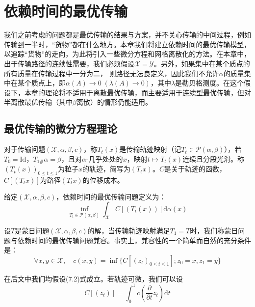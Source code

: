 \documentclass[cn,10pt,math=newtx,citestyle=gb7714-2015,bibstyle=gb7714-2015]{elegantbook}
\begin{document}
\chapter{依赖时间的最优传输}

我们之前考虑的问题都是最优传输的结果与方案，并不关心传输的中间过程，例如传输到一半时，“货物”都在什么地方。本章我们将建立依赖时间的最优传输模型，以追踪“货物”的走向，为此将引入一些微分方程和网格离散化的方法。在本章中，出于传输路径的连续性需要，我们必须假设$\mathcal{X}=\mathcal{Y}$。另外，如果集中在某个质点的所有质量在传输过程中一分为二，
则路径无法良定义，因此我们不允许$\alpha$的质量集中在某个质点上，即$\alpha(A)\to 0\;(\lambda(A)\to 0)$，其中$\lambda$是勒贝格测度。在这个假设下，本章的理论将不适用于离散最优传输，而主要适用于连续型最优传输，但对半离散最优传输（其中$\beta$离散）的情形仍能适用。

\section{最优传输的微分方程理论}

\begin{definition}[轨迹与位移成本]
    对于传输问题$(\mathcal{X}, \alpha,\beta,c)$，称$T_t(x)$是传输轨迹映射（记$T_t\in \mathcal{P}(\alpha,\beta)$），若$T_0=\text{Id}$，$T_{1\#}\alpha=\beta$，且对$\alpha$-几乎处处的$x$，映射$t\mapsto T_t(x)$连续且分段光滑。称$(T_t(x))_{0\leq t\leq 1}$为粒子$x$的轨迹，简写为$(T_tx)$。$C$是关于轨迹的函数，$C[(T_tx)]$为路径$(T_tx)$的位移成本。
\end{definition}

\begin{definition}[依赖时间的最优传输]
    给定$(\mathcal{X}, \alpha,\beta,c)$，依赖时间的最优传输问题定义为：
    \begin{equation}
        \inf_{T_t\in \mathcal{P}(\alpha,\beta)} \int_\mathcal{X} C[(T_t(x))] \text{d}\alpha(x)
    \end{equation}
\end{definition}

设$T$是蒙日问题$(\mathcal{X}, \alpha,\beta,c)$的解，当传输轨迹映射满足$T_1=T$时，我们称蒙日问题与依赖时间的最优传输问题兼容。事实上，兼容性的一个简单而自然的充分条件是：
\begin{equation}
    \forall x,y\in \mathcal{X},\quad c(x,y)=\inf\{C[(z_t)_{0\leq t\leq 1}]; z_0=x,z_1=y\}
\end{equation}

在后文中我们均假设(7.2)式成立。若轨迹可微，我们可以设
\begin{equation}
    C[(z_t)]=\int_0^1 c\left(\frac{\partial}{\partial t} z_t\right) \text{d}t
\end{equation}
\end{document}
